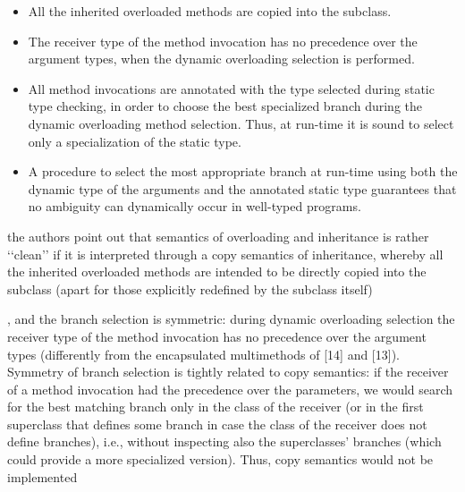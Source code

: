 \documentclass{article}
\begin{document}
\begin{itemize}
  \item All the inherited overloaded methods are copied into the subclass.
  \item The receiver type of the method invocation has no precedence over the argument types, when the  dynamic overloading selection is performed.
  \item All method invocations are annotated with the type selected during static type checking, in order to choose the best specialized branch during the dynamic overloading method selection. Thus, at run-time it is sound  to select only a specialization of the static type.
  \item A procedure to select the most appropriate branch at run-time using both the dynamic type of the arguments and the annotated static type guarantees that no ambiguity can dynamically occur in well-typed programs.

\end{itemize} 







the authors point out that semantics of overloading and inheritance is rather ‘‘clean’’ if it is interpreted through a copy semantics of inheritance, whereby all the inherited overloaded methods are intended to be directly copied into the subclass (apart for those explicitly redefined by the subclass itself) 

, and the branch selection is symmetric: during dynamic overloading selection the receiver type of the method invocation has no precedence over the argument types (differently from the encapsulated multimethods of [14] and [13]).
Symmetry of branch selection is tightly related to copy semantics: if the receiver of a method invocation had the precedence over the parameters, we would search for the best matching branch only in the class of the receiver (or in the first superclass that defines some branch in case the class of the receiver does not define branches), i.e., without inspecting also the superclasses’ branches (which could provide a more specialized version). Thus, copy semantics would not be implemented

\medskip 


\end{document}
